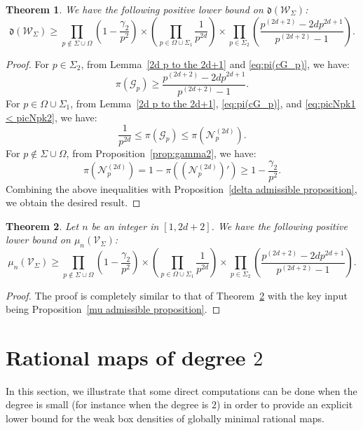 \documentclass[12pt]{amsart}
\newtheorem{theorem}{Theorem}[section]
\newcommand{\cN}{\mathcal{N}}
\newcommand{\cW}{\mathcal{W}}
\newcommand{\cG}{\mathcal{G}}
\newcommand{\V}{\mathcal{V}}
\numberwithin{equation}{section}
\begin{document}
    
    \begin{theorem}\label{main thm of section 4 Wsigma}
        We have the following positive lower bound on $\mathfrak{d}(\cW_{\Sigma})$:
        \begin{equation}\label{d(cSSigma}\mathfrak{d}(\cW_\Sigma)\geq \prod_{p\notin \Sigma\cup \Omega}\left(1-\frac{\gamma_2}{p^2}\right)\times \left(\prod_{p\in \Omega\cup \Sigma_1}\frac{1}{p^{2d}}\right)\times \prod_{p\in \Sigma_2}\left(\frac{p^{(2d+2)}-2d p^{2d+1}}{p^{(2d+2)}-1}\right).\end{equation}
    \end{theorem}
    \begin{proof}
        For $p\in\Sigma_2$, from Lemma~\ref{2d p to the 2d+1} and \eqref{eq:pi(cG_p)}, we have:
        $$\pi(\cG_p)\geq \frac{p^{(2d+2)}-2d p^{2d+1}}{p^{(2d+2)}-1}.$$
        For $p\in \Omega\cup\Sigma_1$, from Lemma~\ref{2d p to the 2d+1}, \eqref{eq:pi(cG_p)}, and
        \eqref{eq:picNpk1 < picNpk2}, we have:
        $$\frac{1}{p^{2d}}\leq \pi(\cG_p)\leq \pi(\cN_p^{(2d)}).$$
        For $p\notin\Sigma\cup\Omega$, from Proposition~\ref{prop:gamma2}, we have:
        $$\pi(\cN_p^{(2d)})=1-\pi((\cN_p^{(2d)})')\geq 1-\frac{\gamma_2}{p^2}.$$
        Combining the above inequalities with Proposition~\ref{delta admissible proposition}, we obtain the desired result.
    \end{proof}

\begin{theorem}\label{main thm of section 4}
        Let $n$ be an integer in $[1,2d+2]$. We have the following positive lower bound on
        $\mu_n(\V_{\Sigma})$:
        \begin{equation}\label{mun(cSSigma}\mu_n(\V_\Sigma)\geq \prod_{p\notin \Sigma\cup \Omega}\left(1-\frac{\gamma_2}{p^2}\right)\times \left(\prod_{p\in \Omega\cup \Sigma_1}\frac{1}{p^{2d}}\right)\times \prod_{p\in \Sigma_2}\left(\frac{p^{(2d+2)}-2d p^{2d+1}}{p^{(2d+2)}-1}\right).\end{equation}
    \end{theorem}
\begin{proof}
    The proof is completely similar to that of Theorem~\ref{main thm of section 4} with the key input being Proposition~\ref{mu admissible proposition}.
\end{proof}


\section{Rational maps of degree $2$}\label{s 5}
In this section, we illustrate that some direct computations can be done when the degree is small  (for instance when the degree is $2$) in order to provide an explicit lower bound for the weak box densities of globally minimal rational maps.
\end{document}
